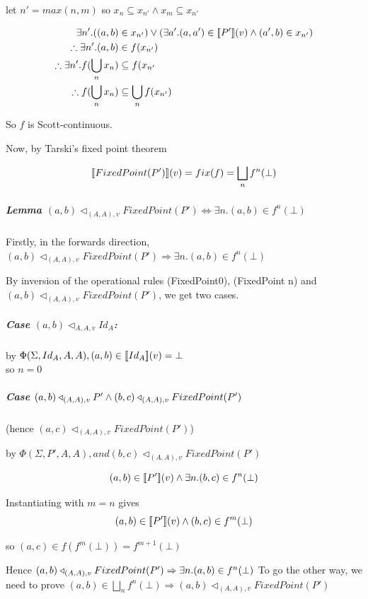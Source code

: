 \documentclass[12pt,a4paper,twoside,openright]{report}
\newcommand{\db}[1]{{\bf [\![}#1{\bf ]\!]}}
\newcommand{\deno}[1]{\db{#1}(v)}
\newcommand{\denoRule}[2]{#1 \in \deno{#2}}
\newcommand{\opRule}[3]{#1 \triangleleft_{#2, v} #3}
\newcommand{\phiRule}[3]{\Phi(\Sigma, #1, #2, #3)}
\begin{document}
let $n' = max(n, m)$ so $x_n \subseteq x_{n'}  \wedge x_m \subseteq x_{n'}$

\begin{equation}
\begin{split}
\exists n'. ((a,b) & \in x_{n'} ) \vee (\exists a'. \denoRule{(a, a')}{P'} \wedge (a', b) \in x_{n'})\\
\therefore\exists n'. (a, b) &\in f(x_{n'})\\
\therefore\exists n'. f(\bigcup_nx_n) &\subseteq f(x_{n'}\\
\therefore f(\bigcup_nx_n) &\subseteq \bigcup_nf(x_{n'})\\
\end{split}
\end{equation}


\setlength{\leftskip}{0pt}
So $f$ is Scott-continuous.

Now, by Tarski's fixed point theorem

$$\deno{FixedPoint(P')} = fix(f) = \bigsqcup_nf^n(\bot)$$


\subparagraph{Lemma $\opRule{(a, b)}{(A, A)}{FixedPoint(P')} \Leftrightarrow \exists n. (a, b) \in f^n(\bot)$}

Firstly, in the forwards direction, $\opRule{(a, b)}{(A, A)}{FixedPoint(P')} \Rightarrow \exists n. (a, b) \in f^n(\bot)$

By inversion of the operational rules (FixedPoint0), (FixedPoint n) and $\opRule{(a, b)}{(A, A)}{FixedPoint(P')}$, we get two cases.



\subparagraph{Case $\opRule{(a,b)}{A, A}{Id_A}$:\\}
by $\phiRule{Id_A}{A}{A}, \denoRule{(a, b)}{Id_A} = \bot$\\so $n = 0$


\subparagraph{Case $\opRule{(a, b)}{(A,A)}{P'} \wedge \opRule{(b, c)}{(A,A)}{FixedPoint(P')}\\ $}
(hence $\opRule{(a, c)}{(A, A)}{FixedPoint(P')}$)

by $\phiRule{P'}{A}{A}, and \opRule{(b,c)}{(A,A)}{FixedPoint(P')}$

$$\denoRule{(a, b)}{P'} \wedge \exists n. (b, c) \in f^n(\bot)$$

Instantiating with $m = n$ gives
$$\denoRule{(a, b)}{P'} \wedge (b, c) \in f^m(\bot)$$

so $(a,c) \in f(f^m(\bot)) = f^{m+1}(\bot)$

Hence $\opRule{(a, b)}{(A, A)}{FixedPoint(P')} \Rightarrow \exists n. (a, b) \in f^n(\bot)\\\\ $
To go the other way, we need to prove $(a, b) \in \bigsqcup_nf^n(\bot) \Rightarrow \opRule{(a, b)}{(A, A)}{FixedPoint(P')}$
\end{document}
